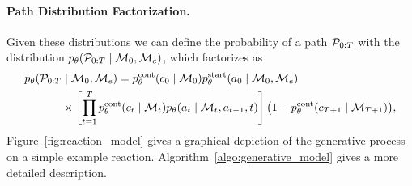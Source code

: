\paragraph{Path Distribution Factorization.}
Given these distributions we can define the probability of a path ${\mathcal{P}}_{0:T}$
with the distribution $p_\theta( {\mathcal{P}}_{0:T} \mid {\mathcal{M}}_0, {\mathcal{M}}_e)$, which factorizes as
\begin{align}
\label{eq:jointprob}
p_\theta({\mathcal{P}}_{0:T} &\mid {\mathcal{M}}_0, {\mathcal{M}}_e) 
=
	p_\theta^\textrm{cont}(c_0 \mid {\mathcal{M}}_0)
	p_\theta^{\mathrm{start}}(a_0 \mid {\mathcal{M}}_0, {\mathcal{M}}_e)\\ \nonumber 
	& \times
	\left[\prod_{t=1}^{T}
		p_\theta^{\mathrm{cont}}(c_{t} \mid {\mathcal{M}}_{t})
		p_\theta(a_t \mid {\mathcal{M}}_{t}, a_{t-1}, t)
	\right]
	\big(1- p_\theta^{\mathrm{cont}}(c_{T+1} \mid {\mathcal{M}}_{T+1})\big)
	,
\end{align}
Figure~\ref{fig:reaction_model} gives a graphical depiction of the generative process on a simple example reaction. Algorithm~\ref{algo:generative_model} gives a more detailed description.









